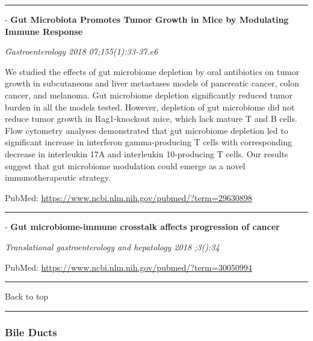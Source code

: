 \documentclass[]{article}
\begin{document}
{}

{}

\begin{center}\rule{0.5\linewidth}{\linethickness}\end{center}

 - \textbf{Gut Microbiota Promotes Tumor Growth in Mice by Modulating
Immune Response}

\emph{Gastroenterology 2018 07;155(1):33-37.e6}

We studied the effects of gut microbiome depletion by oral antibiotics
on tumor growth in subcutaneous and liver metastases models of
pancreatic cancer, colon cancer, and melanoma. Gut microbiome depletion
significantly reduced tumor burden in all the models tested. However,
depletion of gut microbiome did not reduce tumor growth in Rag1-knockout
mice, which lack mature T and B cells. Flow cytometry analyses
demonstrated that gut microbiome depletion led to significant increase
in interferon gamma-producing T cells with corresponding decrease in
interleukin 17A and interleukin 10-producing T cells. Our results
suggest that gut microbiome modulation could emerge as a novel
immunotherapeutic strategy.

PubMed: \url{https://www.ncbi.nlm.nih.gov/pubmed/?term=29630898}

{}

{}

\begin{center}\rule{0.5\linewidth}{\linethickness}\end{center}

 - \textbf{Gut microbiome-immune crosstalk affects progression of
cancer}

\emph{Translational gastroenterology and hepatology 2018 ;3():34}

PubMed: \url{https://www.ncbi.nlm.nih.gov/pubmed/?term=30050994}

{}

{}

\begin{center}\rule{0.5\linewidth}{\linethickness}\end{center}

Back to top

\begin{center}\rule{0.5\linewidth}{\linethickness}\end{center}

\pagebreak

\hypertarget{bile-ducts}{%
\subsubsection{Bile Ducts}\label{bile-ducts}}
\end{document}
